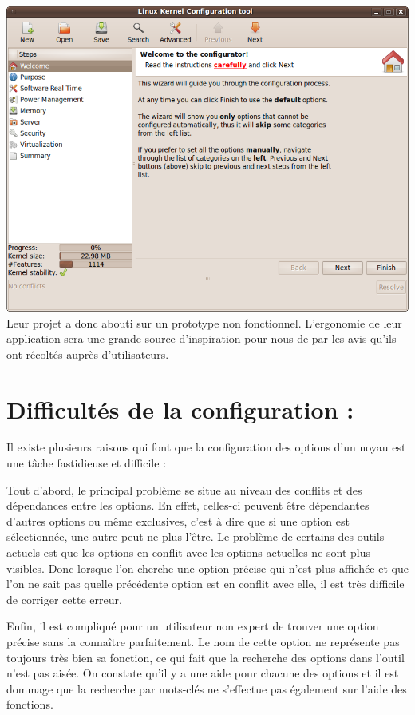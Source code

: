 \documentclass[16pts]{report}
\begin{document}
\includegraphics[scale=0.6]{illustrations/lkc-config.png} \\

Leur projet a donc abouti sur un prototype non fonctionnel.
    L’ergonomie de leur application sera une grande source d’inspiration
    pour nous de par les avis qu’ils ont récoltés auprès d’utilisateurs.

\chapter{Difficultés de la configuration :}

Il existe plusieurs raisons qui font que la configuration des options d’un noyau
    est une tâche fastidieuse et difficile :

Tout d’abord, le principal problème se situe au niveau des conflits et
    des dépendances entre les options. En effet, celles-ci peuvent
    être dépendantes d’autres options ou même exclusives, c’est à dire que si
    une option est sélectionnée, une autre peut ne plus l’être.
    Le problème de certains des outils actuels est que les options en conflit
    avec les options actuelles ne sont plus visibles. Donc lorsque l’on cherche
    une option précise qui n’est plus affichée et que l’on ne sait pas quelle
    précédente option est en conflit avec elle, il est très difficile de
    corriger cette erreur.

Enfin, il est compliqué pour un utilisateur non expert de trouver une
    option précise sans la connaître parfaitement. Le nom de cette option
    ne représente pas toujours très bien sa fonction, ce qui fait que
    la recherche des options dans l’outil n’est pas aisée.
    On constate qu’il y a une aide pour chacune des options et
    il est dommage que la recherche par mots-clés ne s’effectue pas également
    sur l’aide des fonctions.


\end{document}
